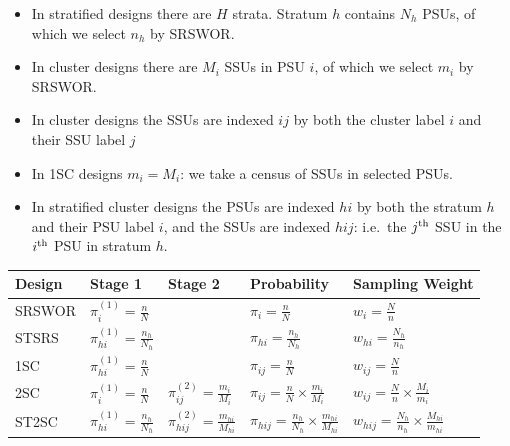 \documentclass[
]{book}
\newcounter{none} %
\providecommand{\tightlist}{%
  \setlength{\itemsep}{0pt}\setlength{\parskip}{0pt}}
\begin{document}
\begin{itemize}
\tightlist
\item
  In stratified designs there are \(H\) strata. Stratum \(h\) contains \(N_h\) PSUs, of which we select \(n_h\) by SRSWOR.
\item
  In cluster designs there are \(M_i\) SSUs in PSU \(i\), of which we select \(m_i\) by SRSWOR.\\
\item
  In cluster designs the SSUs are indexed \(ij\) by both the cluster label \(i\) and their SSU label \(j\)
\item
  In 1SC designs \(m_i=M_i\): we take a census of SSUs in selected PSUs.
\item
  In stratified cluster designs the PSUs are indexed \(hi\) by both the stratum \(h\) and their PSU label \(i\),
  and the SSUs are indexed \(hij\): i.e.~the \(j^{\rm th}\) SSU in the \(i^{\rm th}\) PSU in stratum \(h\).
\end{itemize}

{\def\LTcaptype{none} %
\begin{longtable}[]{@{}
  >{\raggedright\arraybackslash}p{}
  >{\centering\arraybackslash}p{}
  >{\centering\arraybackslash}p{}
  >{\centering\arraybackslash}p{}
  >{\centering\arraybackslash}p{}@{}}
\toprule\noalign{}
\begin{minipage}[b]{\linewidth}\raggedright
Design
\end{minipage} & \begin{minipage}[b]{\linewidth}\centering
Stage 1
\end{minipage} & \begin{minipage}[b]{\linewidth}\centering
Stage 2
\end{minipage} & \begin{minipage}[b]{\linewidth}\centering
Probability
\end{minipage} & \begin{minipage}[b]{\linewidth}\centering
Sampling Weight
\end{minipage} \\
\midrule\noalign{}
\endhead
\bottomrule\noalign{}
\endlastfoot
SRSWOR & \(\pi^{(1)}_{i}=\frac{n}{N}\) & & \(\pi_i=\frac{n}{N}\) & \(w_i = \frac{N}{n}\) \\
STSRS & \(\pi^{(1)}_{hi}=\frac{n_h}{N_h}\) & & \(\pi_{hi}=\frac{n_h}{N_h}\) & \(w_{hi} = \frac{N_h}{n_h}\) \\
1SC & \(\pi^{(1)}_{hi}=\frac{n}{N}\) & & \(\pi_{ij}=\frac{n}{N}\) & \(w_{ij} = \frac{N}{n}\) \\
2SC & \(\pi^{(1)}_i=\frac{n}{N}\) & \(\pi^{(2)}_{ij}=\frac{m_i}{M_i}\) & \(\pi_{ij}=\frac{n}{N}\times\frac{m_i}{M_i}\) & \(w_{ij} = \frac{N}{n}\times\frac{M_i}{m_i}\) \\
ST2SC & \(\pi^{(1)}_{hi}=\frac{n_h}{N_h}\) & \(\pi^{(2)}_{hij}=\frac{m_{hi}}{M_{hi}}\) & \(\pi_{hij}=\frac{n_h}{N_h}\times\frac{m_{hi}}{M_{hi}}\) & \(w_{hij} = \frac{N_h}{n_h}\times\frac{M_{hi}}{m_{hi}}\) \\
\end{longtable}
}
\end{document}
